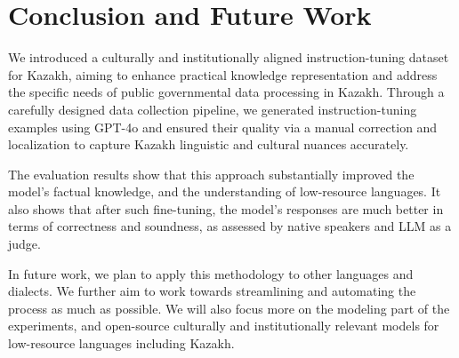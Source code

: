 
\section{Conclusion and Future Work}
We introduced a culturally and institutionally aligned instruction-tuning dataset for Kazakh, %
aiming to enhance practical knowledge representation and address the specific needs of public governmental data processing in Kazakh.
Through a carefully designed data collection pipeline,
we generated instruction-tuning examples using GPT-4o and ensured their quality via a manual correction and localization to capture Kazakh linguistic and cultural nuances accurately.

The evaluation results show that this approach substantially improved the model's factual knowledge, and the understanding of low-resource languages.
It also shows that after such fine-tuning, the model's responses are much better in terms of correctness and soundness, as assessed by native speakers and LLM as a judge.

In future work, we plan to apply this methodology to other languages and dialects. We further aim to work towards streamlining and automating the process as much as possible. 
We will also focus more on the modeling part of the experiments, and open-source culturally and institutionally relevant models for low-resource languages including Kazakh.

